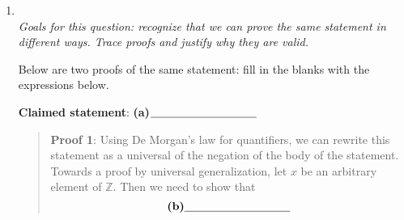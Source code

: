 \documentclass[12pt, oneside]{article}
\begin{document}
\begin{enumerate}
\begin{enumerate}
\begin{enumerate}
\item When might it be appropriate to use induction?
    \begin{enumerate}
        \item To prove that an existential claim over the set of integers is true.
        \item To prove that a universal claim over the real numbers is true.
        \item To prove that a conditional claim is true.
        \item None of the above.
    \end{enumerate}
\item When might it be appropriate to use proof by contradiction?
    \begin{enumerate}
        \item To prove that an existential claim over the set of integers is true.
        \item To prove that a universal claim over the real numbers is true.
        \item To prove that a conditional claim is true.
        \item None of the above.
    \end{enumerate}
\end{enumerate}
         \item \hspace{1in}\\ 

{\it Goals for this question: recognize that we can prove the same statement
in different ways.  Trace proofs and justify why they are valid.}

Below are two proofs of the same statement: fill in the blanks with the 
expressions below.

{\bf Claimed statement}:  \textbf{(a)}$\underline{\phantom{\hspace{1.3in}}}$
\begin{quote}

{\bf Proof 1}: Using De Morgan's law for quantifiers, 
we can rewrite this statement as a universal of the negation of the body of the statement.
Towards a proof by universal generalization, let $x$ be an arbitrary element of $\mathbb{Z}$. Then we need to show that
$$\textbf{(b)}\underline{\phantom{\hspace{1.3in}}}$$


\end{quote}
\end{enumerate}
\end{enumerate}
\end{document}
